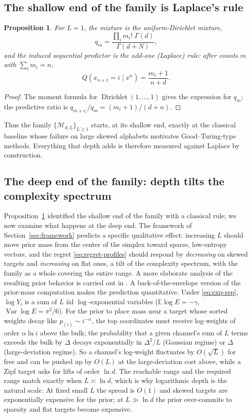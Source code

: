 \documentclass[11pt]{article}
\newcommand{\E}{\mathbb{E}}
\newcommand{\Nseq}{N}
\newcommand{\model}{\mathcal{M}_{d,L}}
\newtheorem{proposition}{Proposition}
\begin{document}
\subsection{The shallow end of the family is Laplace's rule}
\begin{proposition}
\label{prop:laplace}
For \(L=1\), the mixture is the uniform-Dirichlet mixture,
\[
  q_m
  =
  \frac{\prod_i m_i!\;\Gamma(d)}{\Gamma(d+\Nseq)},
\]
and the induced sequential predictor is the add-one (Laplace) rule: after
counts \(m\) with \(\sum_i m_i=n\),
\[
  Q(x_{n+1}=i\mid x^n)
  =
  \frac{m_i+1}{n+d}.
\]
\end{proposition}
\begin{proof}
The moment formula for \(\operatorname{Dirichlet}(1,\dots,1)\) gives the
expression for \(q_m\); the predictive ratio is
\(q_{m+e_i}/q_m=(m_i+1)/(d+n)\).
\end{proof}
Thus the family \(\{\model\}_{L\ge1}\) starts, at its shallow end, exactly at
the classical baseline whose failure on large skewed alphabets motivates
Good--Turing-type methods.  Everything that depth adds is therefore measured
against Laplace by construction.
\subsection{The deep end of the family: depth tilts the complexity
spectrum}
\label{sec:spectrum}
Proposition~\ref{prop:laplace} identified the shallow end of the family
with a classical rule; we now examine what happens at the deep end.  The
framework of Section~\ref{sec:framework} predicts a specific qualitative
effect: increasing \(L\) should move prior mass from the center of the
simplex toward sparse, low-entropy vectors, and the regret
\eqref{eq:regret-profiles} should respond by \emph{decreasing} on skewed
targets and \emph{increasing} on flat ones, a tilt of the complexity
spectrum, with the family as a whole covering the entire range. A more elaborate analysis of the resulting prior behavior is carried out in \cite{jeong2026phase}.
A back-of-the-envelope version of the prior-mass computation makes the
prediction quantitative.  Under \eqref{eq:exp-rep},
\(\log Y_i\) is a sum of \(L\) iid \(\log\)-exponential variables
(\(\E\log E=-\gamma\), \(\operatorname{Var}\log E=\pi^2/6\)).  For the prior
to place mass near a target whose sorted weights decay like
\(p_{(i)}\sim i^{-\alpha}\), the top coordinates must receive log-weights of
order \(\alpha\ln i\) above the bulk; the probability that a given channel's
sum of \(L\) terms exceeds the bulk by \(\Delta\) decays exponentially in
\(\Delta^2/L\) (Gaussian regime) or \(\Delta\) (large-deviation regime).
So a channel's log-weight fluctuates by $O(\sqrt{L})$ for free and can be
pushed up by $O(L)$ at the large-deviation cost above, while a Zipf target
asks for lifts of order $\ln d$. The reachable range and the required range
match exactly when $L \asymp \ln d$, which is why logarithmic depth is the
natural scale.  At fixed small \(L\)
the spread is \(O(1)\) and skewed targets are exponentially expensive for the
prior; at \(L\gg\ln d\) the prior over-commits to sparsity and flat targets
become expensive.
\end{document}
